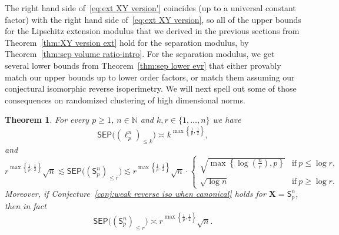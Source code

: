\documentclass[11pt,reqno]{amsart}
\renewcommand{\le}{\leqslant}
\renewcommand{\ge}{\geqslant}
\newcommand{\n}{\{1,\ldots,n\}}
\newcommand{\X}{\mathbf X}
\newtheorem{theorem}{Theorem}
\theoremstyle{remark}
\newcommand{\sfS}{\mathsf{S}}
\newcommand{\N}{\mathbb N}
\renewcommand{\1}{\mathbf 1}
\newcommand{\sep}{\mathsf{SEP}}
\begin{document}
The right hand side of~\eqref{eq:ext XY version'} coincides (up to a universal constant factor) with the right hand side of~\eqref{eq:ext XY version}, so all of the upper bounds  for the Lipschitz extension modulus that we derived in the previous sections from Theorem~\ref{thm:XY version ext} hold for the separation modulus, by  Theorem~\ref{thm:sep volume ratio-intro}. For the separation modulus, we get several lower bounds from Theorem~\ref{thm:sep lower evr} that either provably match our upper bounds up to lower order factors, or  match them assuming our conjectural isomorphic reverse isoperimetry. We will next spell out some of those  consequences on randomized clustering of high dimensional norms.


\begin{theorem}\label{thm:sparse and low rank} For every $p\ge 1$, $n\in \N$ and $k,r\in \n$ we have
\begin{equation}\label{eq:sep k-sparse}
\sep\big((\ell_p^n)_{\le k}\big)\asymp k^{\max\left\{\frac{1}{p},\frac12\right\}},
\end{equation}
and
\begin{equation}\label{eq:sep schatten rank k}
r^{\max\left\{\frac{1}{p},\frac12\right\}}\sqrt{n}\lesssim \sep\big((\sfS_p^{n})_{\le r}\big)\lesssim r^{\max\left\{\frac{1}{p},\frac12\right\}}\sqrt{n} \cdot \left\{\begin{array}{ll}\sqrt{\max\left\{\log\left(\frac{ n}{r}\right),p\right\}}&\mathrm{if}\ p\le \log r,\\
\sqrt{\log n}&\mathrm{if}\ p\ge \log r.\end{array}\right.
\end{equation}
Moreover, if Conjecture~\ref{conj:weak reverse iso when canonical}  holds for  $\X=\sfS_p^n$, then in fact
\begin{equation}\label{eq:sharp rank less r intro}
\sep\big((\sfS_p^{n})_{\le r}\big)\asymp r^{\max\left\{\frac{1}{p},\frac12\right\}}\sqrt{n}.
\end{equation}
\end{theorem}
\end{document}
